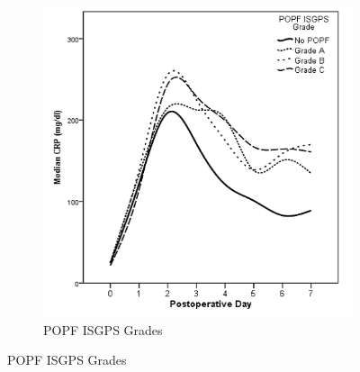 \begin{figure}[t]
\begin{subfigure}{0.48\textwidth}
		\includegraphics[width=\textwidth]{Figures/crp_comp_crp_popf_isgps}
		\caption{POPF ISGPS Grades}
		\label{fig:crp_comp_crp_popf_isgps}
	\end{subfigure}
\end{figure}
\hfill






